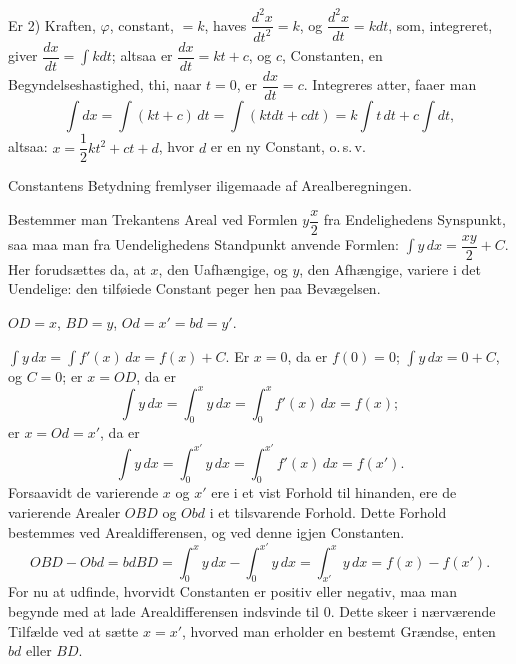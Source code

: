 \documentclass[12pt]{book}
\newcommand{\opage}[1]{\marginnote{\footnotesize\textit{[#1]}}}
\begin{document}
Er 2) Kraften, $\varphi$, constant, $= k$, haves
$\dfrac{d^{2}x}{dt^{2}} = k$, og $\dfrac{d^{2}x}{dt} = kdt$, som,
integreret, giver $\dfrac{dx}{dt} = \int kdt$; altsaa er
$\dfrac{dx}{dt} = kt + c$, og $c$, Constanten, en Begyndelseshastighed,
thi, naar $t = 0$, er $\dfrac{dx}{dt} = c$. Integreres atter, faaer man
\[
\int dx = \int (kt + c)\,dt = \int (ktdt + cdt)
  = k\int t\,dt + c\int dt,
\]
altsaa: $x = \dfrac{1}{2}kt^{2} + ct + d$, hvor $d$ er en ny Constant,
o.\,s.\,v.

Constantens Betydning fremlyser iligemaade af Arealberegningen.

\opage{82} Bestemmer man Trekantens Areal ved Formlen $y\dfrac{x}{2}$ fra
Endelighedens Synspunkt, saa maa man fra Uendelighedens Standpunkt
anvende Formlen: $\int y\,dx = \dfrac{xy}{2} + C$. Her forudsættes da,
at $x$, den Uafhængige, og $y$, den Afhængige, variere i det
Uendelige: den tilføiede Constant peger hen paa Bevægelsen.

\begin{center}

$OD = x$, $BD = y$, $Od = x' = bd = y'$.
\end{center}

$\int y\,dx = \int f'(x)\,dx = f(x) + C$. Er $x = 0$, da er
$f(0) = 0$; $\int y\,dx = 0 + C$, og $C = 0$; er $x = OD$, da er
\[
\int y\,dx = \int_{0}^{x} y\,dx = \int_{0}^{x} f'(x)\,dx = f(x);
\]
er $x = Od = x'$, da er
\[
\int y\,dx = \int_{0}^{x'} y\,dx = \int_{0}^{x'} f'(x)\,dx = f(x').
\]
Forsaavidt de varierende $x$ og $x'$ ere i et vist Forhold til
hinanden, ere de varierende Arealer $OBD$ og $Obd$ i et tilsvarende
Forhold. Dette Forhold bestemmes ved Arealdifferensen, og ved denne
igjen Constanten.
\[
OBD - Obd = bdBD = \int_{0}^{x} y\,dx - \int_{0}^{x'} y\,dx
  = \int_{x'}^{x} y\,dx = f(x) - f(x').
\]
For nu at udfinde, hvorvidt Constanten er positiv eller negativ, maa
man begynde med at lade Arealdifferensen indsvinde til 0. Dette skeer
i nærværende Tilfælde ved at sætte $x = x'$, hvorved man erholder en
bestemt Grændse, enten $bd$ eller $BD$.
\end{document}
